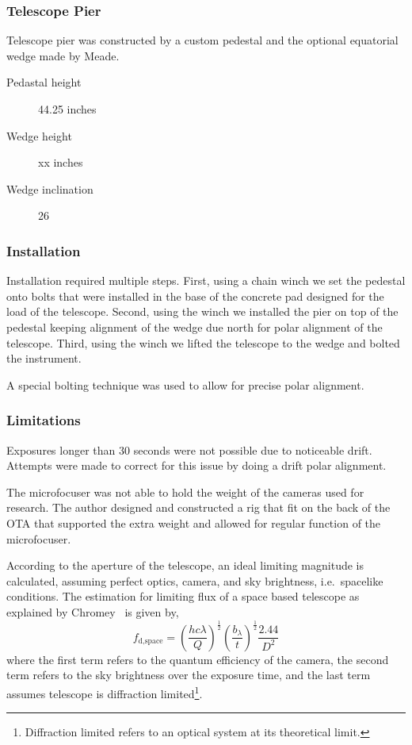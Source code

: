 \subsubsection{Telescope Pier}
Telescope pier was constructed by a custom pedestal and the optional equatorial wedge made by Meade.
\begin{description}
    \item[Pedastal height] 44.25 inches
    \item[Wedge height] xx inches
    \item[Wedge inclination] \SI{26}{\deg}
\end{description}

\subsubsection{Installation}
Installation required multiple steps.
First, using a chain winch we set the pedestal onto bolts that were installed in the base of the concrete pad designed for the load of the telescope. 
Second, using the winch we installed the pier on top of the pedestal keeping alignment of the wedge due north for polar alignment of the telescope.
Third, using the winch we lifted the telescope to the wedge and bolted the instrument.

A special bolting technique was used to allow for precise polar alignment.

\subsubsection{Limitations}
Exposures longer than 30 seconds were not possible due to noticeable drift.
Attempts were made to correct for this issue by doing a drift polar alignment.

The microfocuser was not able to hold the weight of the cameras used for research.
The author designed and constructed a rig that fit on the back of the OTA that supported the extra weight and allowed
for regular function of the microfocuser.

According to the aperture of the telescope, an ideal limiting magnitude is calculated, assuming perfect optics, camera, and sky brightness,
i.e.\  spacelike conditions.
The estimation for limiting flux of a space based telescope as explained by Chromey~\cite{chromey_2010} is given by,
\begin{equation}
    f_{\text{d,space}} = {\left(\frac{h c\lambda}{Q}\right)}^\frac{1}{2} {\left( \frac{b_{\lambda}}{t}\right)}^\frac{1}{2}\frac{2.44}{D^2}
    \label{eq:limflux}
\end{equation}
where the first term refers to the quantum efficiency of the camera, the second term refers to
the sky brightness over the exposure time, and the last term assumes telescope is
diffraction limited\footnote{Diffraction limited refers to an optical system at its theoretical limit.}.


